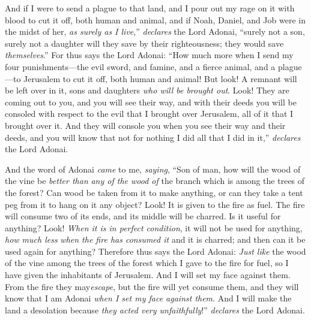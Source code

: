 \begin{biblechapter}
\verse And if I were to send a plague to that land, and I pour out my rage on it with blood to cut it off, both human and animal,
\verse and if Noah, Daniel, and Job were in the midst of her, \textit{as surely as I live},” \textit{declares} the Lord Adonai, “surely not a son, surely not a daughter will they save by their righteousness; they would save \textit{themselves}.”
\verse For thus says the Lord Adonai: “How much more when I send my four punishments—the evil sword, and famine, and a fierce animal, and a plague—to Jerusalem to cut it off, both human and animal!
\verse But look! A remnant will be left over in it, sons and daughters \textit{who will be brought out}. Look! They are coming out to you, and you will see their way, and with their deeds you will be consoled with respect to the evil that I brought over Jerusalem, all of it that I brought over it.
\verse And they will console you when you see their way and their deeds, and you will know that not for nothing I did all that I did in it,” \textit{declares} the Lord Adonai.
\end{biblechapter}

\begin{biblechapter} %
 And the word of Adonai \textit{came} to me, \textit{saying},
\verse “Son of man, how will the wood of the vine be \textit{better than} \textit{any of the wood of} the branch which is among the trees of the forest?
\verse Can wood be taken from it to make anything, or can they take a tent peg from it to hang on it any object?
\verse Look! It is given to the fire as fuel. The fire will consume two of its ends, and its middle will be charred. Is it useful for anything?
\verse Look! \textit{When it is in perfect condition}, it will not be used for anything, \textit{how much less} \textit{when the fire has consumed it} and it is charred; and then can it be used again for anything?
\verse Therefore thus says the Lord Adonai: \textit{Just like} the wood of the vine among the trees of the forest which I gave to the fire for fuel, so I have given the inhabitants of Jerusalem.
\verse And I will set my face against them. From the fire they may\textit{escape}, but the fire will yet consume them, and they will know that I am Adonai \textit{when I set my face against them}.
\verse And I will make the land a desolation because \textit{they acted very unfaithfully}!” \textit{declares} the Lord Adonai.
\end{biblechapter}

